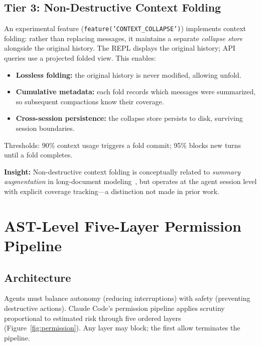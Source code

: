 \documentclass{article}
\newcommand{\code}[1]{\texttt{#1}}
\newcommand{\insight}[1]{%
  \begin{mdframed}[backgroundcolor=blue!5, linecolor=blue!30, linewidth=0.5pt,
    topline=true, bottomline=true, leftline=true, rightline=true,
    innertopmargin=4pt, innerbottommargin=4pt]
  \small\textbf{Insight:} #1
  \end{mdframed}
}
\begin{document}
\subsection{Tier 3: Non-Destructive Context Folding}

An experimental feature (\code{feature('CONTEXT\_COLLAPSE')}) implements context folding: rather than replacing messages, it maintains a separate \emph{collapse store} alongside the original history. The REPL displays the original history; API queries use a projected folded view. This enables:

\begin{itemize}
  \item \textbf{Lossless folding:} the original history is never modified, allowing unfold.
  \item \textbf{Cumulative metadata:} each fold records which messages were summarized, so subsequent compactions know their coverage.
  \item \textbf{Cross-session persistence:} the collapse store persists to disk, surviving session boundaries.
\end{itemize}

Thresholds: 90\% context usage triggers a fold commit; 95\% blocks new turns until a fold completes.

\insight{Non-destructive context folding is conceptually related to \emph{summary augmentation} in long-document modeling~\cite{zhang2024survey}, but operates at the agent session level with explicit coverage tracking---a distinction not made in prior work.}

\section{AST-Level Five-Layer Permission Pipeline}
\label{sec:permissions}

\subsection{Architecture}

Agents must balance autonomy (reducing interruptions) with safety (preventing destructive actions). Claude Code's permission pipeline applies scrutiny proportional to estimated risk through five ordered layers (Figure~\ref{fig:permission}). Any layer may block; the first allow terminates the pipeline.
\end{document}
